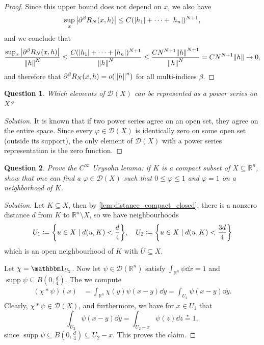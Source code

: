 \documentclass{article}
\theoremstyle{plain}
\newtheorem{question}{Question}
\theoremstyle{remark}
\newenvironment{solution}{\begin{proof}[Solution]\renewcommand\qedsymbol{}}{\end{proof}}
\renewcommand{\phi}{\varphi}
\newcommand{\Bb}{\mathbb}
\newcommand{\Cal}{\mathcal}
\newcommand{\RR}{\Bb R}
\newcommand{\DD}{\Cal D}
\newcommand\ceq\coloneqq %
\newcommand\ind{\mathbbm 1} %
\newcommand\pt\partial
\DeclareMathOperator{\supp}{supp}
\newcommand\clos\overline
\begin{document}
\begin{proof}
Since this upper bound does not depend on $x$, we also have
\[
\sup_x \abs{\pt^\beta R_N(x, h)} \leq C(\abs{h_1} + \dotsb + \abs{h_n})^{N+1}, 
\]
and we conclude that
\[ 
\frac{\sup_x \abs{\pt^\beta R_N(x, h)}}{\norm{h}^N} \leq \frac{C(\abs{h_1} + \dotsb + \abs{h_n})^{N+1}}{\norm{h}^N} \leq \frac{C N^{N+1} \norm{h}^{N+1}}{\norm{h}^N} = CN^{N+1} \norm{h} \to 0, 
\]
and therefore that $\pt^\beta R_N(x, h) = o(\norm{h}^n)$ for all multi-indices $\beta$. 
\end{proof}

\begin{question}
	Which elements of $\DD(X)$ can be represented as a power series on $X$? 
\end{question}

\begin{solution}
	It is known that if two power series agree on an open set, they agree on the entire space. Since every $\phi \in \DD(X)$ is identically zero on some open set (outside its support), the only element of $\DD(X)$ with a power series representation is the zero function. 
\end{solution}

\begin{question}
	Prove the $C^\infty$ Urysohn lemma: if $K$ is a compact subset of $X \subseteq \RR^n$, show that one can find a $\phi \in \DD(X)$ such that $0 \leq \phi \leq 1$ and $\phi = 1$ on a neighborhood of $K$. 
\end{question}

\begin{solution}
	Let $K \subseteq X$, then by \cref{lem:distance_compact_closed}, there is a nonzero distance $d$ from $K$ to $\RR^n \setminus X$, so we have neighbourhoods
	\[
	U_1 \ceq \qty{u \in X \mid d(u, K) < \frac d4}, \quad U_2 \ceq \qty{u \in X \mid d(u, K) < \frac{3d}{4}}
	\]
	which is an open neighbourhood of $K$ with $\clos U \subseteq X$. 
	
	 Let $\chi = \ind_{U_2}$. Now let $\psi \in \DD(\RR^n)$ satisfy $\int_{\RR^n} \psi \dd{x} = 1$ and $\supp\psi \subseteq B(0, \frac d4)$. The we compute
	\begin{align*}
		(\chi * \psi)(x) &= \int_{\RR^n} \chi(y) \psi(x - y) \dd{y} = \int_{U_2} \psi(x - y) \dd{y}.
	\end{align*}
	Clearly, $\chi * \psi \in \DD(X)$, and furthermore, we have for $x \in U_1$ that
	\[
	\int_{U_2} \psi(x - y) \dd{y} = \int_{U_2 - x} \psi(z) \dd{z} \overset\star= 1,
	\]
	since $\supp\psi \subseteq B(0, \frac d4) \subseteq U_2 - x$. This proves the claim.
\end{solution}
\end{document}
